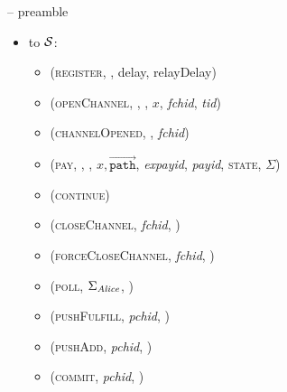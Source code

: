 \begin{center}
\begin{systembox}{\fpaynet{} -- preamble}
\begin{itemize}
        \begin{itemize}
          \item (\textsc{registerDone}, \alice, pubKey)
          \item (\textsc{corrupted}, \alice)
          \item (\textsc{channelAnnounced}, \alice, $p_{\alice, F}, p_{\bob,
          F}$, \textit{fchid}, \textit{pchid}, \textit{tid})
          \item (\textsc{newUpdate}, \texttt{receipt}, \alice)
          \item (\textsc{newPayments}, \texttt{payments}, \alice)
          \item (\textsc{closedChannel}, \texttt{channel}, \alice)
          \item (\textsc{resolvePays}, \texttt{charged})
          \item (\textsc{adversaryOpenChannel}, $x$, \texttt{bobDelay},
          \textit{tid}, \textit{intid}, \textit{from} \alice, \textit{to} \bob)
          \item (\textsc{adversarySendInvoice}, $x$, \textit{expayid},
          \textit{payid}, \textit{invid}, \textit{from} \alice, \textit{to}
          \bob)
        \end{itemize}
        \item to $\mathcal{S}$:
        \begin{itemize}
          \item (\textsc{register}, \alice, delay, relayDelay)
          \item (\textsc{openChannel}, \alice, \bob, $x$, \textit{fchid},
          \textit{tid})
          \item (\textsc{channelOpened}, \alice, \textit{fchid})
          \item (\textsc{pay}, \alice, \bob, $x,
          \overrightarrow{\mathtt{path}}$, \textit{expayid},
          \textit{payid}, \textsc{state}, $\Sigma$)
          \item (\textsc{continue})
          \item (\textsc{closeChannel}, \textit{fchid}, \alice)
          \item (\textsc{forceCloseChannel}, \textit{fchid}, \alice)
          \item (\textsc{poll}, $\Sigma_{\mathit{Alice}}$, \alice)
          \item (\textsc{pushFulfill}, \textit{pchid}, \alice)
          \item (\textsc{pushAdd}, \textit{pchid}, \alice)
          \item (\textsc{commit}, \textit{pchid}, \alice)

\end{itemize}
\end{itemize}
\end{systembox}
\end{center}
